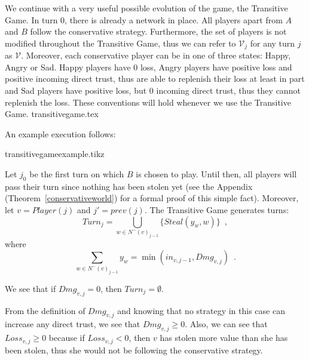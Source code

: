   We continue with a very useful possible evolution of the game, the Transitive Game. In turn 0, there is already a network
  in place. All players apart from $A$ and $B$ follow the conservative strategy. Furthermore, the set of players is not
  modified throughout the Transitive Game, thus we can refer to $\mathcal{V}_j$ for any turn $j$ as $\mathcal{V}$.
  Moreover, each conservative player can be in one of three states: Happy, Angry or Sad. Happy players have 0 loss, Angry
  players have positive loss and positive incoming direct trust, thus are able to replenish their loss at least in part and
  Sad players have positive loss, but 0 incoming direct trust, thus they cannot replenish the loss. These conventions will
  hold whenever we use the Transitive Game.
  {transitivegame.tex}

  \noindent An example execution follows:

  {transitivegameexample.tikz}

  \noindent Let $j_0$ be the first turn on which $B$ is chosen to play. Until then, all players will pass their turn since
  nothing has been stolen yet (see the Appendix (Theorem~\ref{conservativeworld}) for a formal proof of this simple fact).
  Moreover, let $v = Player(j)$ and $j' = prev\left(j\right)$.  The Transitive Game generates turns:
  \begin{equation}
    Turn_j = \bigcup\limits_{w \in N^{-}\left(v\right)_{j-1}}\{Steal\left(y_w,w\right)\} \enspace,
  \end{equation}
  where
  \begin{equation*}
    \sum\limits_{w \in N^{-}\left(v\right)_{j-1}}y_w = \min\left(in_{v, j-1}, Dmg_{v, j}\right) \enspace.
  \end{equation*}
 
  \noindent We see that if $Dmg_{v, j} = 0$, then $Turn_j = \emptyset$.

  From the definition of $Dmg_{v,j}$ and knowing that no strategy in this case can increase any direct trust, we see
  that $Dmg_{v,j} \geq 0$. Also, we can see that $Loss_{v,j} \geq 0$ because if $Loss_{v,j} < 0$, then $v$ has
  stolen more value than she has been stolen, thus she would not be following the conservative strategy.
